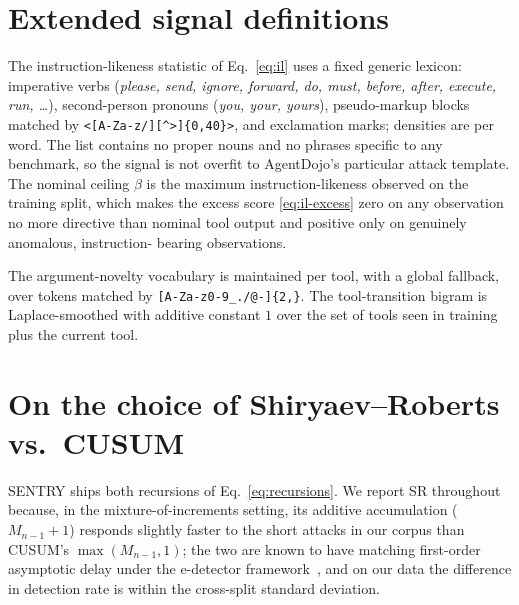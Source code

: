 \documentclass[pdflatex,sn-mathphys-num]{sn-jnl}%
\theoremstyle{thmstyleone}%
\theoremstyle{thmstyletwo}%
\theoremstyle{thmstylethree}%
\begin{document}
\begin{appendices}
\section{Extended signal definitions}\label{app:signals}

The instruction-likeness statistic of Eq.~\eqref{eq:il} uses a fixed generic
lexicon: imperative verbs (\emph{please, send, ignore, forward, do, must,
before, after, execute, run, \dots}), second-person pronouns (\emph{you, your,
yours}), pseudo-markup blocks matched by \verb|<[A-Za-z/][^>]{0,40}>|, and
exclamation marks; densities are per word. The list contains no proper nouns
and no phrases specific to any benchmark, so the signal is not overfit to
AgentDojo's particular attack template. The nominal ceiling \(\beta\) is the
maximum instruction-likeness observed on the training split, which makes the
excess score \eqref{eq:il-excess} zero on any observation no more directive
than nominal tool output and positive only on genuinely anomalous, instruction-
bearing observations.

The argument-novelty vocabulary is maintained per tool, with a global fallback,
over tokens matched by \verb|[A-Za-z0-9_./@-]{2,}|. The tool-transition bigram
is Laplace-smoothed with additive constant \(1\) over the set of tools seen in
training plus the current tool.

\section{On the choice of Shiryaev--Roberts vs.\ CUSUM}\label{app:srcusum}

SENTRY ships both recursions of Eq.~\eqref{eq:recursions}. We report SR
throughout because, in the mixture-of-increments setting, its additive
accumulation (\(M_{n-1}+1\)) responds slightly faster to the short attacks in
our corpus than CUSUM's \(\max(M_{n-1},1)\); the two are known to have
matching first-order asymptotic delay under the e-detector
framework~\cite{shin2023edetectors}, and on our data the difference in
detection rate is within the cross-split standard deviation.

\end{appendices}


\end{document}
